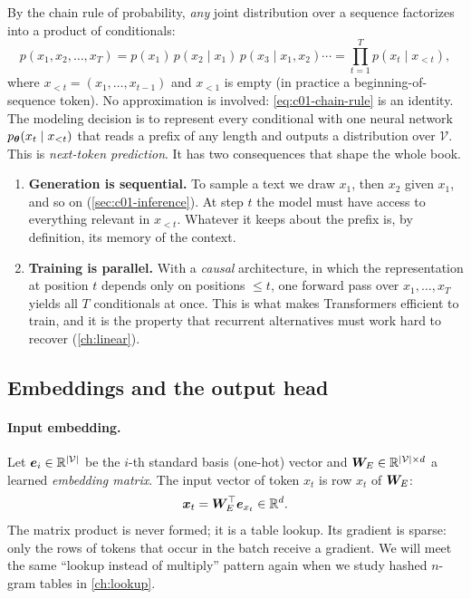By the chain rule of probability, \emph{any} joint distribution over a sequence factorizes
into a product of conditionals:
\begin{equation}\label{eq:c01-chain-rule}
  p(x_1, x_2, \dots, x_T)
  = p(x_1)\, p(x_2 \mid x_1)\, p(x_3 \mid x_1, x_2) \cdots
  = \prod_{t=1}^{T} p(x_t \mid x_{<t}),
\end{equation}
where $x_{<t} = (x_1, \dots, x_{t-1})$ and $x_{<1}$ is empty (in practice a
beginning-of-sequence token). No approximation is involved: \eqref{eq:c01-chain-rule} is an
identity. The modeling decision is to represent every conditional with one neural network
$p_{\bm{\theta}}(x_t \mid x_{<t})$ that reads a prefix of any length and outputs a distribution
over $\mathcal{V}$. This is \emph{next-token prediction}. It has two consequences that shape
the whole book.
\begin{enumerate}
  \item \textbf{Generation is sequential.} To sample a text we draw $x_1$, then $x_2$
  given $x_1$, and so on (\cref{sec:c01-inference}). At step $t$ the model must have access
  to everything relevant in $x_{<t}$. Whatever it keeps about the prefix is, by definition,
  its memory of the context.
  \item \textbf{Training is parallel.} With a \emph{causal} architecture, in which the
  representation at position $t$ depends only on positions $\le t$, one forward pass over
  $x_1, \dots, x_T$ yields all $T$ conditionals at once. This is what makes Transformers
  efficient to train, and it is the property that recurrent alternatives must work hard to
  recover (\cref{ch:linear}).
\end{enumerate}

\subsection{Embeddings and the output head}\label{sec:c01-embeddings}

\paragraph{Input embedding.} Let $\bm{e}_i \in \mathbb{R}^{\left\lvert \mathcal{V}\right\rvert}$ be the $i$-th standard
basis (one-hot) vector and $\bm{W}_E \in \mathbb{R}^{\left\lvert \mathcal{V}\right\rvert \times d}$ a learned
\emph{embedding matrix}. The input vector of token $x_t$ is row $x_t$ of $\bm{W}_E$:
\begin{equation}\label{eq:c01-embedding}
  \bm{x}_t = \bm{W}_E^{\top} \bm{e}_{x_t} \in \mathbb{R}^{d}.
\end{equation}
The matrix product is never formed; it is a table lookup. Its gradient is sparse: only
the rows of tokens that occur in the batch receive a gradient. We will meet the same
``lookup instead of multiply'' pattern again when we study hashed $n$-gram tables in
\cref{ch:lookup}.

